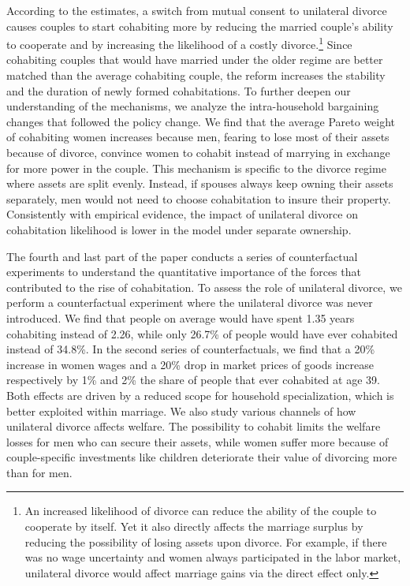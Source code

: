 \documentclass[12pt]{article}
\numberwithin{table}{section}
\begin{document}
According to the estimates, a switch from mutual consent to unilateral divorce causes couples to start cohabiting more by reducing the married couple's ability to cooperate and by increasing the likelihood of a costly divorce.\footnote{An increased likelihood of divorce can reduce the ability of the couple to cooperate by itself. Yet it also directly affects the marriage surplus by reducing the possibility of losing assets upon divorce. For example, if there was no wage uncertainty and women always participated in the labor market, unilateral divorce would affect marriage gains via the direct effect only.} Since cohabiting couples that would have married under the older regime are better matched than the average cohabiting couple, the reform increases the stability and the duration of newly formed cohabitations. To further deepen our understanding of the mechanisms, we analyze the intra-household bargaining changes that followed the policy change. We find that the average Pareto weight of cohabiting women increases because men, fearing to lose most of their assets because of divorce, convince women to cohabit instead of marrying in exchange for more power in the couple. This mechanism is specific to the divorce regime where assets are split evenly. Instead, if spouses always keep owning their assets separately, men would not need to choose cohabitation to insure their property. Consistently with empirical evidence, the impact of unilateral divorce on cohabitation likelihood is lower in the model under separate ownership. %

The fourth and last part of the paper conducts a series of counterfactual experiments to understand the quantitative importance of the forces that contributed to the rise of cohabitation. To assess the role of unilateral divorce, we perform a counterfactual experiment where the unilateral divorce was never introduced. We find that people on average would have spent 1.35 years cohabiting instead of 2.26, while only 26.7\% of people would have ever cohabited instead of 34.8\%. In the second series of counterfactuals, we find that a 20\% increase in women wages and a 20\% drop in market prices of goods increase respectively by 1\% and 2\% the share of people that ever cohabited at age 39. Both effects are driven by a reduced scope for household specialization, which is better exploited within marriage. We also study various channels of how unilateral divorce affects welfare. The possibility to cohabit limits the welfare losses for men who can secure their assets, while women suffer more because of couple-specific investments like children deteriorate their value of divorcing more than for men.
\end{document}
